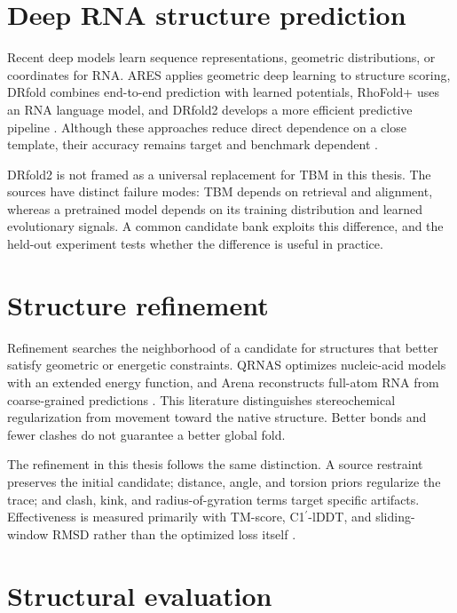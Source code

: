 \documentclass[12pt,a4paper,oneside]{report}
\newcommand{\cprime}{C1$^{\prime}$}
\begin{document}
\section{Deep RNA structure prediction}

Recent deep models learn sequence representations, geometric distributions, or
coordinates for RNA. ARES applies geometric deep learning to structure scoring, DRfold
combines end-to-end prediction with learned potentials, RhoFold+ uses an RNA language
model, and DRfold2 develops a more efficient predictive pipeline
\cite{ares,drfold,rhofoldplus,drfold2}. Although these approaches reduce direct
dependence on a close template, their accuracy remains target and benchmark dependent
\cite{state_of_rnart,drfold2}.

DRfold2 is not framed as a universal replacement for TBM in this thesis. The sources
have distinct failure modes: TBM depends on retrieval and alignment, whereas a pretrained
model depends on its training distribution and learned evolutionary signals. A common
candidate bank exploits this difference, and the held-out experiment tests whether the
difference is useful in practice.

\section{Structure refinement}

Refinement searches the neighborhood of a candidate for structures that better satisfy
geometric or energetic constraints. QRNAS optimizes nucleic-acid models with an extended
energy function, and Arena reconstructs full-atom RNA from coarse-grained predictions
\cite{qrnas,arena}. This literature distinguishes stereochemical regularization from
movement toward the native structure. Better bonds and fewer clashes do not guarantee a
better global fold.

The refinement in this thesis follows the same distinction. A source restraint preserves
the initial candidate; distance, angle, and torsion priors regularize the trace; and
clash, kink, and radius-of-gyration terms target specific artifacts. Effectiveness is
measured primarily with TM-score, \cprime{}-lDDT, and sliding-window RMSD rather than the
optimized loss itself \cite{tm_score,lddt,usalign}.

\section{Structural evaluation}
\end{document}
